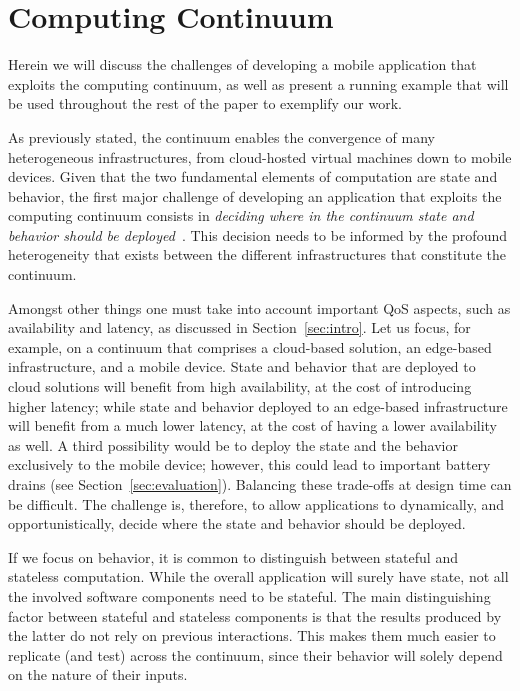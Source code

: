\section{Computing Continuum}
\label{sec:example}

Herein we will discuss the challenges of developing a mobile application that exploits the computing continuum, as well as present a running example that will be used throughout the rest of the paper to exemplify our work.

As previously stated, the continuum enables the convergence of many heterogeneous infrastructures, from cloud-hosted virtual machines down to mobile devices. Given that the two fundamental elements of computation are state and behavior, the first major challenge of developing an application that exploits the computing continuum consists in \emph{deciding where in the continuum state and behavior should be deployed}~\cite{ChiangFogIoT16}. This decision needs to be informed by the profound heterogeneity that exists between the different infrastructures that constitute the continuum. 

Amongst other things one must take into account important QoS aspects, such as availability and latency, as discussed in Section~\ref{sec:intro}. Let us focus, for example, on a continuum that comprises a cloud-based solution, an edge-based infrastructure, and a mobile device. State and behavior that are deployed to cloud solutions will benefit from high availability, at the cost of introducing higher latency; while state and behavior deployed to an edge-based infrastructure will benefit from a much lower latency, at the cost of having a lower availability as well. A third possibility would be to deploy the state and the behavior exclusively to the mobile device; however, this could lead to important battery drains (see Section~\ref{sec:evaluation}). Balancing these trade-offs at design time can be difficult. The challenge is, therefore, to allow applications to dynamically, and opportunistically, decide where the state and behavior should be deployed. 

If we focus on behavior, it is common to distinguish between stateful and stateless computation. While the overall application will surely have state, not all the involved software components need to be stateful. The main distinguishing factor between stateful and stateless components is that the results produced by the latter do not rely on previous interactions. This makes them much easier to replicate (and test) across the continuum, since their behavior will solely depend on the nature of their inputs. 


